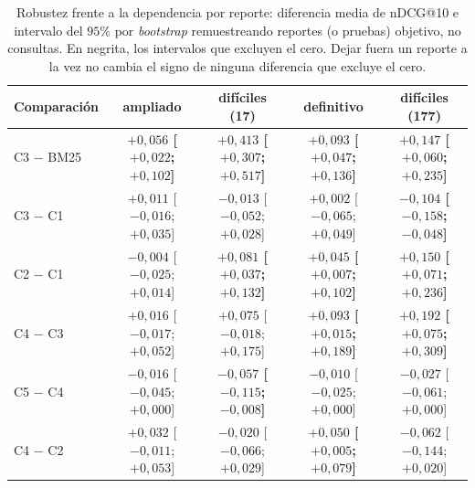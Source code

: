 \begin{table}[htbp]
\centering
\scriptsize
\setlength{\tabcolsep}{3pt}
\renewcommand{\arraystretch}{1.25}
\caption{Robustez frente a la dependencia por reporte: diferencia media de nDCG@10 e intervalo del $95\%$ por \textit{bootstrap} remuestreando reportes (o pruebas) objetivo, no consultas. En negrita, los intervalos que excluyen el cero. Dejar fuera un reporte a la vez no cambia el signo de ninguna diferencia que excluye el cero.}
\label{tab:robustez}
\begin{tabularx}{\textwidth}{@{}l C C C C@{}}
\toprule
\textbf{Comparación} & \textbf{ampliado} & \textbf{difíciles (17)} & \textbf{definitivo} & \textbf{difíciles (177)} \\
\midrule
C3 $-$ BM25 & {\boldmath\bfseries $+0{,}056$ [$+0{,}022$; $+0{,}102$]} & {\boldmath\bfseries $+0{,}413$ [$+0{,}307$; $+0{,}517$]} & {\boldmath\bfseries $+0{,}093$ [$+0{,}047$; $+0{,}136$]} & {\boldmath\bfseries $+0{,}147$ [$+0{,}060$; $+0{,}235$]} \\
C3 $-$ C1 & $+0{,}011$ [$-0{,}016$; $+0{,}035$] & $-0{,}013$ [$-0{,}052$; $+0{,}028$] & $+0{,}002$ [$-0{,}065$; $+0{,}049$] & {\boldmath\bfseries $-0{,}104$ [$-0{,}158$; $-0{,}048$]} \\
C2 $-$ C1 & $-0{,}004$ [$-0{,}025$; $+0{,}014$] & {\boldmath\bfseries $+0{,}081$ [$+0{,}037$; $+0{,}132$]} & {\boldmath\bfseries $+0{,}045$ [$+0{,}007$; $+0{,}102$]} & {\boldmath\bfseries $+0{,}150$ [$+0{,}071$; $+0{,}236$]} \\
C4 $-$ C3 & $+0{,}016$ [$-0{,}017$; $+0{,}052$] & $+0{,}075$ [$-0{,}018$; $+0{,}175$] & {\boldmath\bfseries $+0{,}093$ [$+0{,}015$; $+0{,}189$]} & {\boldmath\bfseries $+0{,}192$ [$+0{,}075$; $+0{,}309$]} \\
C5 $-$ C4 & $-0{,}016$ [$-0{,}045$; $+0{,}000$] & {\boldmath\bfseries $-0{,}057$ [$-0{,}115$; $-0{,}008$]} & $-0{,}010$ [$-0{,}025$; $+0{,}000$] & $-0{,}027$ [$-0{,}061$; $+0{,}000$] \\
C4 $-$ C2 & $+0{,}032$ [$-0{,}011$; $+0{,}053$] & $-0{,}020$ [$-0{,}066$; $+0{,}029$] & {\boldmath\bfseries $+0{,}050$ [$+0{,}005$; $+0{,}079$]} & $-0{,}062$ [$-0{,}144$; $+0{,}020$] \\
\bottomrule
\end{tabularx}
\end{table}


